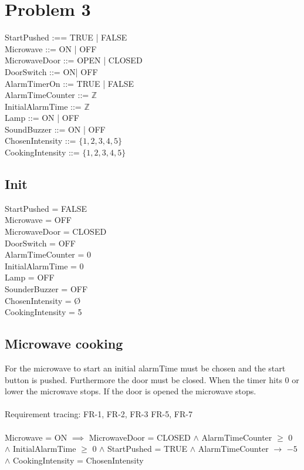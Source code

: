


\chapter{Problem 3}

StartPushed :== TRUE | FALSE \\
Microwave ::= ON | OFF  \\
MicrowaveDoor ::= OPEN | CLOSED \\
DoorSwitch ::= ON| OFF \\
AlarmTimerOn ::= TRUE | FALSE\\
AlarmTimeCounter ::= $\mathbb{Z}$ \\
InitialAlarmTime ::= $\mathbb{Z}$ \\
Lamp ::= ON | OFF \\
SoundBuzzer ::= ON | OFF \\
ChosenIntensity ::= $\{1,2,3,4,5\}$ \\
CookingIntensity ::= $\{1,2,3,4,5\}$ \\

\section{Init}

StartPushed = FALSE \\
Microwave = OFF \\
MicrowaveDoor = CLOSED \\
DoorSwitch = OFF \\
AlarmTimeCounter = 0 \\
InitialAlarmTime = 0 \\
Lamp = OFF \\
SounderBuzzer = OFF \\
ChosenIntensity = Ø\\
CookingIntensity = 5


\section{Microwave cooking}
For the microwave to start an initial alarmTime must be chosen and the start button is pushed. Furthermore the door must be closed. When the timer hits 0 or lower the microwave stops. If the door is opened the microwave stops. \\
\\
Requirement tracing: FR-1, FR-2, FR-3 FR-5, FR-7\\
\\
Microwave = ON $\implies$ MicrowaveDoor = CLOSED $\wedge$ AlarmTimeCounter $\geq$ 0 $\wedge$ InitialAlarmTime $\geq$ 0  $\wedge$ StartPushed = TRUE $\wedge$ AlarmTimeCounter $\rightarrow$ $-5$ $\wedge$ CookingIntensity = ChosenIntensity


